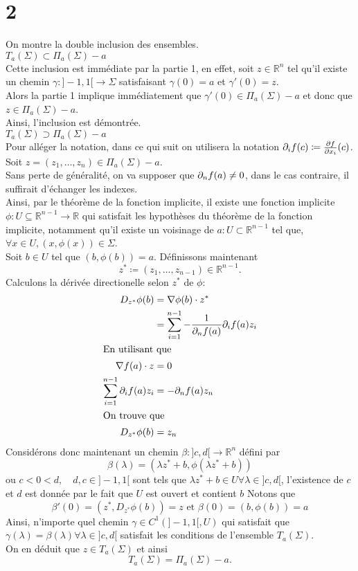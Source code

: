 \documentclass[11pt, a4paper]{article}
\begin{document}
\section*{2}
On montre la double inclusion des ensembles.\\
\hr
\textbf{ $ T_a( \Sigma) \subset \Pi_a( \Sigma) - a$ }\\
Cette inclusion est immédiate par la partie 1, en effet, soit $z \in \mathbb{R}^n$ tel qu'il existe un chemin $\gamma:]-1,1[ \to \Sigma$ satisfaisant $\gamma( 0) = a$ et $\gamma'( 0) = z$.\\
Alors la partie 1 implique immédiatement que $\gamma'( 0) \in \Pi_a( \Sigma) -a$ et donc que $z \in \Pi_a( \Sigma) -a$.\\
Ainsi, l'inclusion est démontrée.\\
\hr
\textbf{ $ T_a( \Sigma) \supset \Pi_a( \Sigma) - a$ }\\
Pour alléger la notation, dans ce qui suit on utilisera la notation $ \partial_i f( c) \coloneqq \frac{\partial f}{\partial x_i}( c) $.\\
Soit $z= ( z_1,\ldots,z_n) \in \Pi_a( \Sigma) -a$.\\
Sans perte de généralité, on va supposer que $\partial_n f ( a) \neq 0$, dans le cas contraire, il suffirait d'échanger les indexes.\\
Ainsi, par le théorème de la fonction implicite, il existe une fonction implicite $\phi : U \subseteq \mathbb{R}^{n-1}\to \mathbb{R}$ qui satisfait les hypothèses du théorème de la fonction implicite, notamment qu'il existe un voisinage de $a : U\subset \mathbb{R}^{n-1}$ tel que, $\forall x \in U, ( x,\phi( x) ) \in \Sigma$.\\
Soit $b \in U$ tel que $( b, \phi( b) ) = a$.
Définissons maintenant
\[ 
	z^{*} \coloneqq ( z_1, \ldots, z_{n-1} )  \in \mathbb{R}^{n-1}.
\]
Calculons la dérivée directionelle selon $z^{*}$ de $\phi $:
\begin{align*}
	D_{z^{*}} \phi( b) &= \nabla \phi( b) \cdot z^{*}\\
			   &= \sum_{i=1} ^{n-1} - \frac{1}{\partial_n f( a) } \partial_i f( a) z_i \\
			   \intertext{En utilisant que }
			   \nabla f ( a) \cdot z &= 0\\
			   \sum_{i=1}^{ n-1}  \partial_i f( a) z_i &= - \partial_n f( a) z_n\\
			   \intertext{On trouve que }
			   D_{z^{*}} \phi( b)  &= z_n
\end{align*}
Considérons donc maintenant un chemin $\beta :]c,d[\to \mathbb{R}^{n}$ défini par
\[ 
	\beta( \lambda) = \left( \lambda z^{*}+ b, \phi( \lambda z^{*}+ b) \right) 
\]
ou $c<0< d, \quad d,c \in ]-1,1[$ sont tels que $\lambda z^{*}+b \in U \forall \lambda \in ]c,d[$, l'existence de $c$ et $d$ est donnée par le fait que $U$ est ouvert et contient $b$
Notons que
\[ 
	\beta'( 0) = \left( z^{*}, D_{z^{*}}\phi( b)  \right) = z \text{ et } \beta( 0) = \left( b,\phi( b) 	 \right) = a
\]
Ainsi, n'importe quel chemin $\gamma \in C^{1}( ]-1,1[ , U) $  qui satisfait que $\gamma( \lambda) = \beta( \lambda) \forall \lambda \in ]c,d[$ satisfait les conditions de l'ensemble $T_a( \Sigma) $.\\
On en déduit que $z \in T_a( \Sigma) $ et ainsi
\[ 
	T_a( \Sigma) = \Pi_a( \Sigma) -a.
\]
\end{document}

